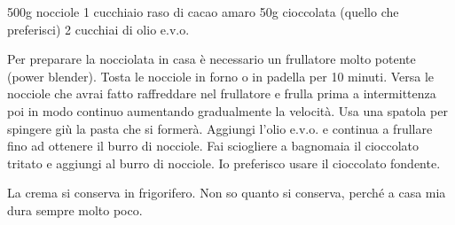 \serves{-}%
\begin{ingreds}
	500g nocciole 
	1 cucchiaio raso di cacao amaro 
	50g cioccolata (quello che preferisci)   
	2 cucchiai di olio e.v.o.


\end{ingreds}

\begin{method}
	Per preparare la nocciolata in casa è necessario un frullatore molto potente (power blender). Tosta le nocciole in forno o in padella per 10 minuti. Versa le nocciole che avrai fatto raffreddare nel frullatore e frulla prima a intermittenza poi in modo continuo aumentando gradualmente la velocità. Usa una spatola per spingere giù la pasta che si formerà. Aggiungi l'olio e.v.o. e continua a frullare fino ad ottenere il burro di nocciole. Fai sciogliere a bagnomaia il cioccolato tritato e aggiungi al burro di nocciole. Io preferisco usare il cioccolato fondente.

	La crema si conserva in frigorifero. Non so quanto si conserva, perché a casa mia dura sempre molto poco.


\end{method}




